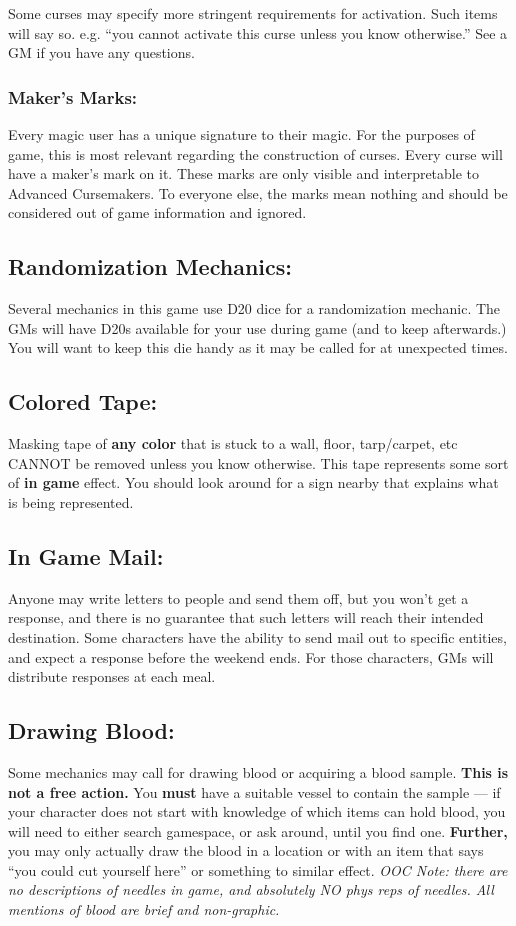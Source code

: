 \documentclass[sheet]{GL2020}
\begin{document}
{Some curses may specify more stringent requirements for activation. Such items will say so. e.g. ``you cannot activate this curse unless you know otherwise.'' See a GM if you have any questions.

\subsubsection{Maker's Marks:}
Every magic user has a unique signature to their magic. For the purposes of game, this is most relevant regarding the construction of curses. Every curse will have a maker's mark on it. These marks are only visible and interpretable to Advanced Cursemakers. To everyone else, the marks mean nothing and should be considered out of game information and ignored. 

\subsection{Randomization Mechanics:}
Several mechanics in this game use D20 dice for a randomization mechanic. The GMs will have D20s available for your use during game (and to keep afterwards.) You will want to keep this die handy as it may be called for at unexpected times.

\subsection{Colored Tape:}
Masking tape of \textbf{any color} that is stuck to a wall, floor, tarp/carpet, etc CANNOT be removed unless you know otherwise. This tape represents some sort of \textbf{in game} effect. You should look around for a sign nearby that explains what is being represented.

\subsection{In Game Mail:}
Anyone may write letters to people and send them off, but you won't get a response, and there is no guarantee that such letters will reach their intended destination. Some characters have the ability to send mail out to specific entities, and expect a response before the weekend ends. For those characters, GMs will distribute responses at each meal. 

\subsection{Drawing Blood:}
Some mechanics may call for drawing blood or acquiring a blood sample. \textbf{This is not a free action.} You \textbf{must} have a suitable vessel to contain the sample — if your character does not start with knowledge of which items can hold blood, you will need to either search gamespace, or ask around, until you find one. \textbf{Further,} you may only actually draw the blood in a location or with an item that says ``you could cut yourself here'' or something to similar effect. \emph{OOC Note: there are no descriptions of needles in game, and absolutely NO phys reps of needles. All mentions of blood are brief and non-graphic.}

}
\end{document}
